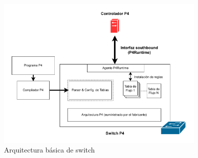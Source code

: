 \begin{figure}[ht!]
\centering
\includegraphics[width=0.9\textwidth]{fig/02_sota/sota_4_sdn_p4.drawio.pdf}
\caption{Arquitectura básica de switch }
\label{fig:sdn_p4}
\end{figure}

